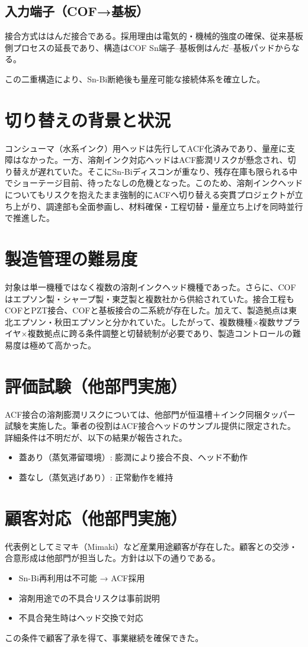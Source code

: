 \documentclass[conference]{IEEEtran}
\begin{document}
\subsection{入力端子（COF→基板）}
接合方式ははんだ接合である。採用理由は電気的・機械的強度の確保、従来基板側プロセスの延長であり、構造はCOF Sn端子–基板側はんだ–基板パッドからなる。

この二重構造により、Sn-Bi断絶後も量産可能な接続体系を確立した。

\section{切り替えの背景と状況}
コンシューマ（水系インク）用ヘッドは先行してACF化済みであり、量産に支障はなかった。一方、溶剤インク対応ヘッドはACF膨潤リスクが懸念され、切り替えが遅れていた。そこにSn-Biディスコンが重なり、残存在庫も限られる中でショーテージ目前、待ったなしの危機となった。このため、溶剤インクヘッドについてもリスクを抱えたまま強制的にACFへ切り替える突貫プロジェクトが立ち上がり、調達部も全面参画し、材料確保・工程切替・量産立ち上げを同時並行で推進した。

\section{製造管理の難易度}
対象は単一機種ではなく複数の溶剤インクヘッド機種であった。さらに、COFはエプソン製・シャープ製・東芝製と複数社から供給されていた。接合工程もCOFとPZT接合、COFと基板接合の二系統が存在した。加えて、製造拠点は東北エプソン・秋田エプソンと分かれていた。したがって、複数機種×複数サプライヤ×複数拠点に跨る条件調整と切替統制が必要であり、製造コントロールの難易度は極めて高かった。

\section{評価試験（他部門実施）}
ACF接合の溶剤膨潤リスクについては、他部門が恒温槽＋インク同梱タッパー試験を実施した。筆者の役割はACF接合ヘッドのサンプル提供に限定された。詳細条件は不明だが、以下の結果が報告された。
\begin{itemize}
 \item 蓋あり（蒸気滞留環境）: 膨潤により接合不良、ヘッド不動作
 \item 蓋なし（蒸気逃げあり）: 正常動作を維持
\end{itemize}

\section{顧客対応（他部門実施）}
代表例としてミマキ（Mimaki）など産業用途顧客が存在した。顧客との交渉・合意形成は他部門が担当した。方針は以下の通りである。
\begin{itemize}
 \item Sn-Bi再利用は不可能 → ACF採用
 \item 溶剤用途での不具合リスクは事前説明
 \item 不具合発生時はヘッド交換で対応
\end{itemize}
この条件で顧客了承を得て、事業継続を確保できた。
\end{document}
